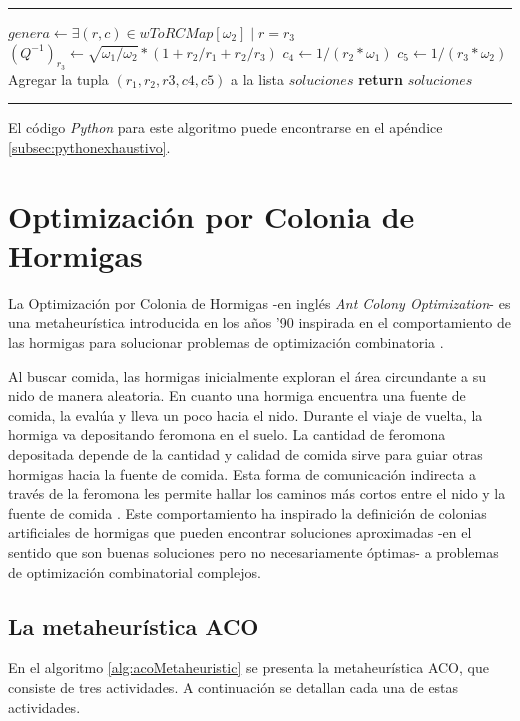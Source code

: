 \documentclass{llncs}
\makeatletter
\newenvironment{breakablealgorithm}
{%
	\begin{center}
		\refstepcounter{algorithm}%
		\hrule height.8pt depth0pt \kern2pt%
		\renewcommand{\caption}[2][\relax]{%
			{\raggedright\textbf{\ALG@name~\thealgorithm} ##2\par}%
			\ifx\relax##1\relax %
			\addcontentsline{loa}{algorithm}{\protect\numberline{\thealgorithm}##2}%
			\else %
			\addcontentsline{loa}{algorithm}{\protect\numberline{\thealgorithm}##1}%
			\fi
			\kern2pt\hrule\kern2pt
		}
	}{%
		\kern2pt\hrule\relax%
	\end{center}
}
\makeatother
\begin{document}
\begin{breakablealgorithm}
\begin{algorithmic}[1]
			\State $genera \gets \exists (r,c) \in wToRCMap[\omega_2] \mid r = r_3$ 
			\State $(Q^{-1})_{r_3} \gets \sqrt{\omega_1 / \omega_2} * (1  + r_2/r_1 + r_2/r_3)$
			\State $c_4 \gets 1/(r_2 * \omega_1)$
			\State $c_5 \gets 1/(r_3 * \omega_2)$ 
			\State Agregar la tupla $(r_1, r_2, r3, c4, c5)$ a la lista $soluciones$
			\EndIf
			\EndIf
			\EndFor
			\EndIf
			\EndFor
			\EndFor
			\State \textbf{return} $soluciones$
			\EndProcedure
		\end{algorithmic}
	\end{breakablealgorithm}

	El código \textit{Python} para este algoritmo puede encontrarse en el apéndice \ref{subsec:pythonexhaustivo}.

  \section{\textbf{Optimización por Colonia de Hormigas}}
  \label{sec:acor}
  La Optimización por Colonia de Hormigas -en inglés \textit{Ant Colony Optimization}- es una metaheurística introducida en los años '90 inspirada en el comportamiento de las hormigas
  para solucionar problemas de optimización combinatoria \cite{dor92,dor:man:col,dor:schu}.
  
  Al buscar comida, las hormigas inicialmente exploran el área circundante a su nido de manera aleatoria. En cuanto una hormiga encuentra una fuente de comida, la evalúa y lleva un poco hacia el nido. Durante el viaje de vuelta, la hormiga va depositando feromona en el suelo. La cantidad de feromona depositada depende de la cantidad y calidad de comida sirve para guiar otras hormigas hacia la fuente de comida. Esta forma de comunicación indirecta a través de la feromona  les permite hallar los caminos más cortos entre el nido y la fuente de comida \cite{gos:aro:den:pas}. Este comportamiento ha inspirado la definición de colonias artificiales de hormigas que pueden encontrar soluciones aproximadas -en el sentido que son buenas soluciones pero no necesariamente óptimas- a problemas de optimización combinatorial complejos.
  
  \subsection{La metaheurística ACO}
  En el algoritmo \ref{alg:acoMetaheuristic} se presenta la metaheurística ACO, que consiste de tres
  actividades. A continuación se detallan cada una de estas actividades.
  
\end{document}
